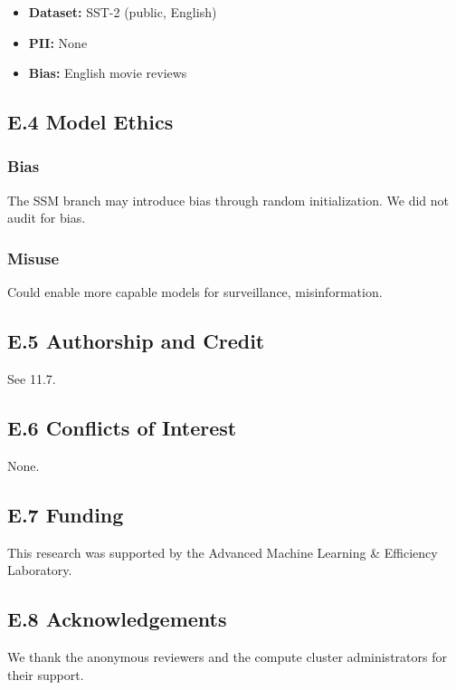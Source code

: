 \begin{itemize}
\item \textbf{Dataset:} SST-2 (public, English)
\item \textbf{PII:} None
\item \textbf{Bias:} English movie reviews

\end{itemize}
\subsection{E.4 Model Ethics}

\subsubsection{Bias}

The SSM branch may introduce bias through random initialization. We did 
not audit for bias.

\subsubsection{Misuse}

Could enable more capable models for surveillance, misinformation.

\subsection{E.5 Authorship and Credit}

See  11.7.

\subsection{E.6 Conflicts of Interest}

None.

\subsection{E.7 Funding}

This research was supported by the Advanced Machine Learning \& Efficiency Laboratory.

\subsection{E.8 Acknowledgements}

We thank the anonymous reviewers and the compute cluster administrators for their support.

